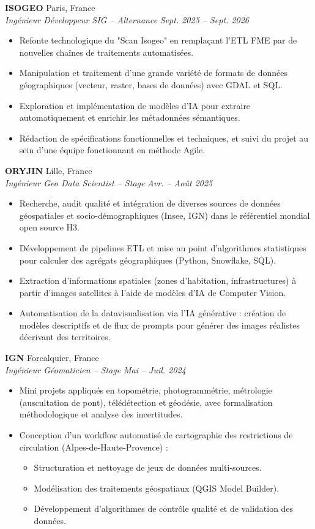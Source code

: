 \documentclass[11pt, a4paper]{article}
\newcommand{\cventry}[4]{
    \vspace{0.1cm}
    \noindent \textbf{#1} \hfill #2 \\
    \noindent \textit{#3} \hfill \textit{#4} \par
    \vspace{0.05cm}
}
\begin{document}
\cventry{ISOGEO}{Paris, France}{Ingénieur Développeur SIG -- Alternance}{Sept. 2025 -- Sept. 2026}
\begin{itemize}[leftmargin=0.5cm, nosep]
    \item Refonte technologique du "Scan Isogeo" en remplaçant l'ETL FME par de nouvelles chaînes de traitements automatisées.
    \item Manipulation et traitement d'une grande variété de formats de données géographiques (vecteur, raster, bases de données) avec GDAL et SQL.
    \item Exploration et implémentation de modèles d'IA pour extraire automatiquement et enrichir les métadonnées sémantiques.
    \item Rédaction de spécifications fonctionnelles et techniques, et suivi du projet au sein d'une équipe fonctionnant en méthode Agile.
\end{itemize}

\cventry{ORYJIN}{Lille, France}{Ingénieur Geo Data Scientist -- Stage}{Avr. -- Août 2025}
\begin{itemize}[leftmargin=0.5cm, nosep]
    \item Recherche, audit qualité et intégration de diverses sources de données géospatiales et socio-démographiques (Insee, IGN) dans le référentiel mondial open source H3.
    \item Développement de pipelines ETL et mise au point d'algorithmes statistiques pour calculer des agrégats géographiques (Python, Snowflake, SQL).
    \item Extraction d'informations spatiales (zones d'habitation, infrastructures) à partir d'images satellites à l'aide de modèles d'IA de Computer Vision.
    \item Automatisation de la datavisualisation via l'IA générative : création de modèles descriptifs et de flux de prompts pour générer des images réalistes décrivant des territoires.
\end{itemize}

\cventry{IGN}{Forcalquier, France}{Ingénieur Géomaticien -- Stage}{Mai -- Juil. 2024}
\begin{itemize}[leftmargin=0.5cm, nosep]
    \item Mini projets appliqués en topométrie, photogrammétrie, métrologie (auscultation de pont), télédétection et géodésie, avec formalisation méthodologique et analyse des incertitudes.
    \item Conception d’un workflow automatisé de cartographie des restrictions de circulation (Alpes-de-Haute-Provence) :
    \begin{itemize}[leftmargin=0.5cm, nosep]
        \item Structuration et nettoyage de jeux de données multi-sources.
        \item Modélisation des traitements géospatiaux (QGIS Model Builder).
        \item Développement d’algorithmes de contrôle qualité et de validation des données.
    \end{itemize}
\end{itemize}
\end{document}
